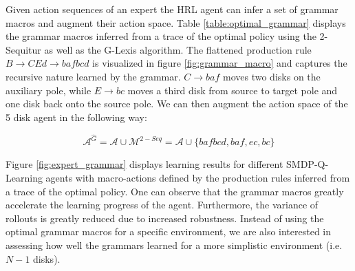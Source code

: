 \documentclass[colorinlistoftodos]{article}
\theoremstyle{definition}
\begin{document}
Given action sequences of an expert the HRL agent can infer a set of grammar macros and augment their action space. Table \ref{table:optimal_grammar} displays the grammar macros inferred from a trace of the optimal policy using the 2-Sequitur as well as the G-Lexis algorithm. The flattened production rule $B \to CEd \to bafbcd$ is visualized in figure \ref{fig:grammar_macro} and captures the recursive nature learned by the grammar. $C \to baf$ moves two disks on the auxiliary pole, while $E \to bc$ moves a third disk from source to target pole and one disk back onto the source pole. We can then augment the action space of the 5 disk agent in the following way:

$$\mathcal{A}^{\hat{G}} = \mathcal{A} \cup \mathcal{M}^{2-Seq} = \mathcal{A} \cup \{bafbcd, baf, ec, bc\}$$


Figure \ref{fig:expert_grammar} displays learning results for different SMDP-Q-Learning agents with macro-actions defined by the production rules inferred from a trace of the optimal policy. One can observe that the grammar macros greatly accelerate the learning progress of the agent. Furthermore, the variance of rollouts is greatly reduced due to increased robustness. Instead of using the optimal grammar macros for a specific environment, we are also interested in assessing how well the grammars learned for a more simplistic environment (i.e. $N-1$ disks).  


%
\end{document}
